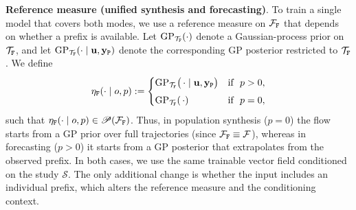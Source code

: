 %
%
%
%
%

\textbf{Reference measure (unified synthesis and forecasting)}.
%
To train a single model that covers both modes, we use a reference measure on $\mathcal{F}_{\tt F}$ that depends on whether a prefix is available.
Let $\mathrm{GP}_{\mathcal T_{\tt F}}(\cdot)$ denote a Gaussian-process prior on $\mathcal T_{\tt F}$, and let $\mathrm{GP}_{\mathcal T_{\tt F}}(\cdot\mid \mathbf u,\mathbf y_{\tt P})$ denote the corresponding GP posterior restricted to $\mathcal T_{\tt F}$.
We define
\begin{equation}
\eta_{\tt F}(\cdot\mid o, p)
:=
\begin{cases}
\mathrm{GP}_{\mathcal T_{\tt F}}\bigl(\,\cdot\mid \mathbf u,\mathbf y_{\tt P}\bigr)
&\text{if} \, \, \, \, p>0,\\[4pt]
\mathrm{GP}_{\mathcal T_{\tt F}}(\,\cdot)
&\text{if} \, \, \, \, p=0,
\end{cases}
\label{eq:reference-measure}
\end{equation}
such that $\eta_{\tt F}(\cdot\mid o, p)\in\mathscr{P}(\mathcal{F}_{\tt F})$.
%
Thus, in population synthesis ($p=0$) the flow starts from a GP prior over full trajectories (since $\mathcal{F}_{\tt F}\equiv\mathcal{F}$), whereas in forecasting ($p>0$) it starts from a GP posterior that extrapolates from the observed prefix.
%
In both cases, we use the same trainable vector field conditioned on the study $\mathcal S$. 
%
The only additional change is whether the input includes an individual prefix, which alters the reference measure and the conditioning context.


